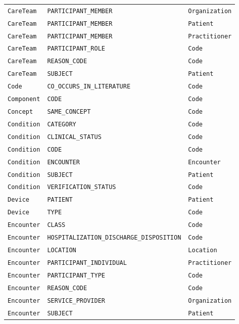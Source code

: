 \begin{longtable}{@{}p{46mm}p{52mm}p{40mm}@{}}
\texttt{CareTeam} & \texttt{PARTICIPANT\_MEMBER} & \texttt{Organization} \\
\texttt{CareTeam} & \texttt{PARTICIPANT\_MEMBER} & \texttt{Patient} \\
\texttt{CareTeam} & \texttt{PARTICIPANT\_MEMBER} & \texttt{Practitioner} \\
\texttt{CareTeam} & \texttt{PARTICIPANT\_ROLE} & \texttt{Code} \\
\texttt{CareTeam} & \texttt{REASON\_CODE} & \texttt{Code} \\
\texttt{CareTeam} & \texttt{SUBJECT} & \texttt{Patient} \\
\texttt{Code} & \texttt{CO\_OCCURS\_IN\_LITERATURE} & \texttt{Code} \\
\texttt{Component} & \texttt{CODE} & \texttt{Code} \\
\texttt{Concept} & \texttt{SAME\_CONCEPT} & \texttt{Code} \\
\texttt{Condition} & \texttt{CATEGORY} & \texttt{Code} \\
\texttt{Condition} & \texttt{CLINICAL\_STATUS} & \texttt{Code} \\
\texttt{Condition} & \texttt{CODE} & \texttt{Code} \\
\texttt{Condition} & \texttt{ENCOUNTER} & \texttt{Encounter} \\
\texttt{Condition} & \texttt{SUBJECT} & \texttt{Patient} \\
\texttt{Condition} & \texttt{VERIFICATION\_STATUS} & \texttt{Code} \\
\texttt{Device} & \texttt{PATIENT} & \texttt{Patient} \\
\texttt{Device} & \texttt{TYPE} & \texttt{Code} \\
\texttt{Encounter} & \texttt{CLASS} & \texttt{Code} \\
\texttt{Encounter} & \texttt{HOSPITALIZATION\_DISCHARGE\_DISPOSITION} & \texttt{Code} \\
\texttt{Encounter} & \texttt{LOCATION} & \texttt{Location} \\
\texttt{Encounter} & \texttt{PARTICIPANT\_INDIVIDUAL} & \texttt{Practitioner} \\
\texttt{Encounter} & \texttt{PARTICIPANT\_TYPE} & \texttt{Code} \\
\texttt{Encounter} & \texttt{REASON\_CODE} & \texttt{Code} \\
\texttt{Encounter} & \texttt{SERVICE\_PROVIDER} & \texttt{Organization} \\
\texttt{Encounter} & \texttt{SUBJECT} & \texttt{Patient} \\

\end{longtable}
